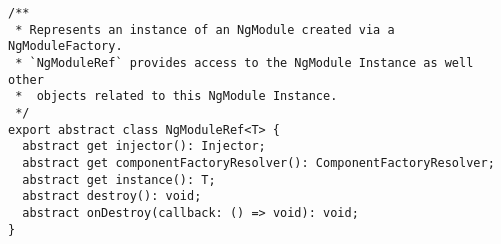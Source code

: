 \begin{verbatim}
/**
 * Represents an instance of an NgModule created via a NgModuleFactory.
 * `NgModuleRef` provides access to the NgModule Instance as well other
 *  objects related to this NgModule Instance.
 */
export abstract class NgModuleRef<T> {
  abstract get injector(): Injector;
  abstract get componentFactoryResolver(): ComponentFactoryResolver;
  abstract get instance(): T;
  abstract destroy(): void;
  abstract onDestroy(callback: () => void): void;
}
\end{verbatim}

